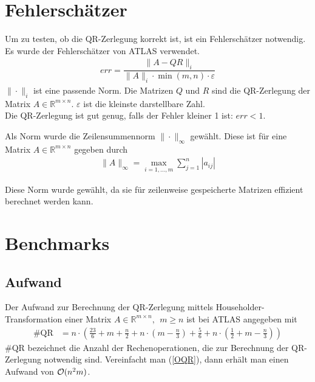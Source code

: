 \section{Fehlerschätzer} \label{Fehlerschätzer}

Um zu testen, ob die QR-Zerlegung korrekt ist, ist ein Fehlerschätzer notwendig.
Es wurde der Fehlerschätzer von ATLAS \cite{atlas} verwendet.
\begin{align}
err = \dfrac{\|A - QR\|_i}{\|A\|_i \cdot \min(m,n) \cdot \varepsilon}
\end{align}
$\|\cdot\|_i$ ist eine passende Norm.
Die Matrizen $Q$ und $R$ sind die QR-Zerlegung der Matrix $A \in \mathbb{R}^{m \times n}$.
$\varepsilon$ ist die kleinste darstellbare Zahl.\\
Die QR-Zerlegung ist gut genug, falls der Fehler kleiner 1 ist: $ err < 1 $.

Als Norm wurde die Zeilensummennorm $\|\cdot\|_\infty$ gewählt.
Diese ist für eine Matrix $A \in \mathbb{R}^{m\times n}$ gegeben durch
\begin{align*}
\|A\|_\infty = \max_{i=1,...,m} \sum_{j=1}^{n} |a_{ij}|
\end{align*}

Diese Norm wurde gewählt, da sie für zeilenweise gespeicherte Matrizen effizient berechnet werden kann.

\section{Benchmarks}
\subsection{Aufwand} \label{aufwand}

Der Aufwand zur Berechnung der QR-Zerlegung mittels Householder-Transformation einer Matrix $A \in \mathbb{R}^{m \times n},~~ m \ge n$ ist bei ATLAS \cite{atlas} angegeben mit
\begin{align}
\#\text{QR} &= n\cdot\left( \frac{23}{6}+m+\frac{n}{2} + n\cdot\left(m-\frac{n}{3}\right) + \frac{5}{6} + n\cdot\left(\frac{1}{2} + m-\frac{n}{3}\right) \right) 
\label{OQR}
\end{align}
$\#\text{QR}$ bezeichnet die Anzahl der Rechenoperationen, die zur Berechnung der QR-Zerlegung notwendig sind. 
Vereinfacht man (\ref{OQR}), dann erhält man einen Aufwand von $ {\cal O}(n^2m)$.




